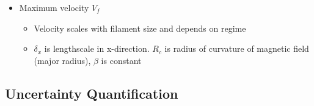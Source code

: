 \documentclass{article}
\begin{document}
\begin{itemize}
\begin{itemize}
        \item Maximum velocity $V_f$
        \begin{itemize}
            \item Velocity scales with filament size and depends on regime
            \item $\delta_x$ is lengthscale in x-direction. $R_c$ is radius of curvature of magnetic field (major radius), $\beta$ is constant
        \end{itemize}
    \end{itemize}
\end{itemize}

\subsection*{Uncertainty Quantification}
\end{document}
